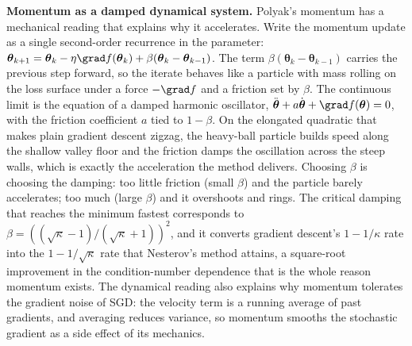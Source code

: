 \begin{mastery}
\textbf{Momentum as a damped dynamical system.} Polyak's momentum
has a mechanical reading that explains why it accelerates. Write the
momentum update as a single second-order recurrence in the
parameter: $\boldsymbol{\theta}_{k+1} = \boldsymbol{\theta}_{k} -
\eta \grad f(\boldsymbol{\theta}_{k}) + \beta(\boldsymbol{\theta}_{k}
- \boldsymbol{\theta}_{k-1})$. The term $\beta(\boldsymbol{\theta}_{k}
- \boldsymbol{\theta}_{k-1})$ carries the previous step forward, so
the iterate behaves like a particle with mass rolling on the loss
surface under a force $-\grad f$ and a friction set by $\beta$. The
continuous limit is the equation of a damped harmonic oscillator,
$\ddot{\boldsymbol{\theta}} + a \dot{\boldsymbol{\theta}} + \grad
f(\boldsymbol{\theta}) = 0$, with the friction coefficient $a$ tied
to $1 - \beta$. On the elongated quadratic that makes plain
gradient descent zigzag, the heavy-ball particle builds speed along
the shallow valley floor and the friction damps the oscillation
across the steep walls, which is exactly the acceleration the
method delivers. Choosing $\beta$ is choosing the damping: too
little friction (small $\beta$) and the particle barely accelerates;
too much (large $\beta$) and it overshoots and rings. The critical
damping that reaches the minimum fastest corresponds to $\beta =
((\sqrt{\kappa} - 1)/(\sqrt{\kappa} + 1))^{2}$, and it converts
gradient descent's $1 - 1/\kappa$ rate into the $1 - 1/\sqrt{\kappa}$
rate that Nesterov's method attains, a square-root improvement in
the condition-number dependence that is the whole reason momentum
exists. The dynamical reading also explains why momentum tolerates
the gradient noise of SGD: the velocity term is a running average
of past gradients, and averaging reduces variance, so momentum
smooths the stochastic gradient as a side effect of its mechanics.
\end{mastery}

